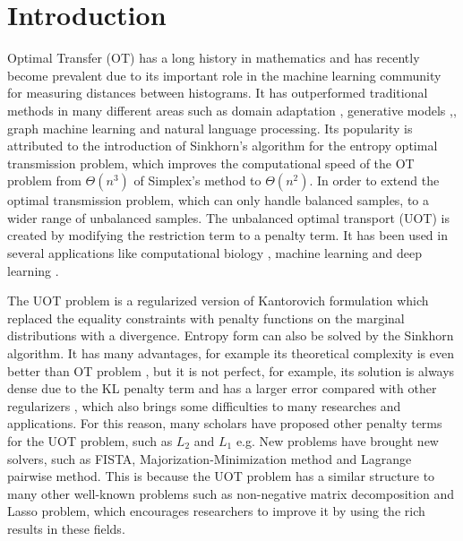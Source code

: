 \section{Introduction}

Optimal Transfer (OT) has a long history in mathematics and has recently become prevalent due to its important role in the machine learning community for measuring distances between histograms. It has outperformed traditional methods in many different areas such as domain adaptation  \citep{7586038}, generative models \citep{arjovsky2017wasserstein},, graph machine learning \citep{NEURIPS2019_fdd5b16f} and natural language processing.  \citep{084adf2f555549c493e0331a00e4ecad} Its popularity is attributed to the introduction of Sinkhorn's algorithm for the entropy optimal transmission problem, \citep{NIPS2013_af21d0c9} which improves the computational speed of the OT problem from $\Theta (n^3)$ of Simplex's method to $\Theta (n^2)$. In order to extend the optimal transmission problem, which can only handle balanced samples, to a wider range of unbalanced samples. The unbalanced optimal transport (UOT) is created by modifying the restriction term to a penalty term. It has been used in several applications like computational biology\citep{SCHIEBINGER2019928} , machine learning \citep{DBLP:conf/aistats/JanatiCG19} and deep learning \citep{DBLP:conf/iclr/YangU19}. 

The UOT problem is a regularized version of Kantorovich formulation which replaced the equality constraints with penalty functions on the marginal distributions with a divergence. Entropy form can also be solved by the Sinkhorn algorithm. It has many advantages, for example its theoretical complexity is even better than OT problem \citep{DBLP:conf/icml/PhamLHPB20}, but it is not perfect, for example, its solution is always dense due to the KL penalty term and has a larger error compared with other regularizers \citep{DBLP:conf/aistats/BlondelSR18}, which also brings some difficulties to many researches and applications. For this reason, many scholars have proposed other penalty terms for the UOT problem, such as $L_2$ and $L_1$ e.g. New problems have brought new solvers, such as FISTA, Majorization-Minimization method and Lagrange pairwise method. \citep{NEURIPS2021_c3c617a9} This is because the UOT problem has a similar structure to many other well-known problems such as non-negative matrix decomposition and Lasso problem, which encourages researchers to improve it by using the rich results in these fields.

